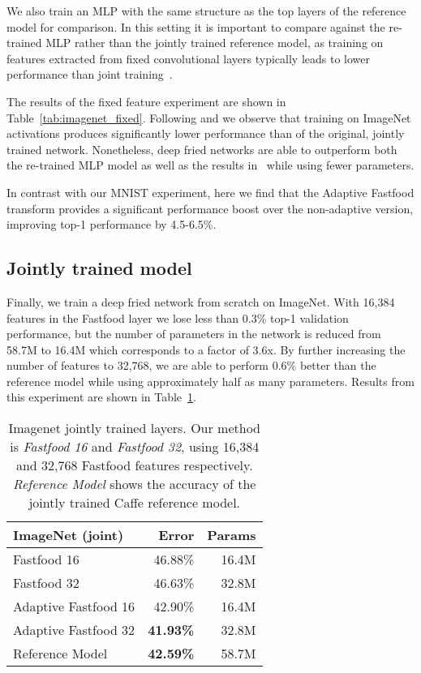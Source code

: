 \documentclass[10pt,twocolumn,letterpaper]{article}
\begin{document}
We also train an MLP with the same structure as the top layers of the reference model for comparison.  In this setting it is important to compare against the re-trained MLP rather than the jointly trained reference model, as training on features extracted from fixed convolutional layers typically leads to lower performance than joint training~\cite{Yosinski:2014}.


The results of the fixed feature experiment are shown in Table~\ref{tab:imagenet_fixed}.  Following \cite{Yosinski:2014} and \cite{song:2014} we observe that training on
ImageNet activations produces significantly lower performance than of the
original, jointly trained network.  Nonetheless, deep fried networks are able to outperform both the re-trained MLP model as well as the results in~\cite{song:2014} while using fewer parameters.

In contrast with our MNIST experiment, here we find that the Adaptive Fastfood transform provides a significant performance boost over the non-adaptive version, improving top-1 performance by 4.5-6.5\%.


\subsection{Jointly trained model}


Finally, we train a deep fried network from scratch on ImageNet.  With 16,384 features in the Fastfood
layer we lose less than 0.3\% top-1 validation performance, but the number of
parameters in the network is reduced from 58.7M to 16.4M which corresponds to a
factor of 3.6x.  By further increasing the number of features to 32,768, we are
able to perform 0.6\% better than the reference model while using approximately
half as many parameters.  Results from this experiment are shown in Table~\ref{tab:imagenet_joint}.

\begin{table}[th]
  \centering
  \begin{tabular}{l|r|r}
    ImageNet (joint) & Error & Params \\
    \hline
    Fastfood 16 & 46.88\% & 16.4M\\
    Fastfood 32 & 46.63\% & 32.8M\\
    Adaptive Fastfood 16 & 42.90\% & 16.4M\\
    Adaptive Fastfood 32  & \textbf{41.93\%} & 32.8M\\
    \hline
    Reference Model & \textbf{42.59\%} & 58.7M\\ \end{tabular}
  \caption{Imagenet jointly trained layers. Our method is
    \emph{Fastfood 16} and \emph{Fastfood 32}, using 16,384 and
    32,768 Fastfood features respectively.
    \emph{Reference Model} shows the accuracy of the jointly
    trained Caffe reference model. }
  \label{tab:imagenet_joint}
\end{table}
\end{document}
